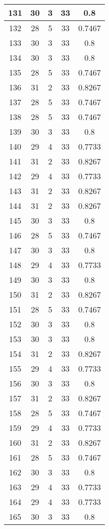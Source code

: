 \documentclass[letterpaper, 12pt]{article}
\begin{document}
\begin{longtable}{|c|c|c|c|c|}
\hline
131 & 30 & 3 & 33 & 0.8 \\
\hline
132 & 28 & 5 & 33 & 0.7467 \\
\hline
133 & 30 & 3 & 33 & 0.8 \\
\hline
134 & 30 & 3 & 33 & 0.8 \\
\hline
135 & 28 & 5 & 33 & 0.7467 \\
\hline
136 & 31 & 2 & 33 & 0.8267 \\
\hline
137 & 28 & 5 & 33 & 0.7467 \\
\hline
138 & 28 & 5 & 33 & 0.7467 \\
\hline
139 & 30 & 3 & 33 & 0.8 \\
\hline
140 & 29 & 4 & 33 & 0.7733 \\
\hline
141 & 31 & 2 & 33 & 0.8267 \\
\hline
142 & 29 & 4 & 33 & 0.7733 \\
\hline
143 & 31 & 2 & 33 & 0.8267 \\
\hline
144 & 31 & 2 & 33 & 0.8267 \\
\hline
145 & 30 & 3 & 33 & 0.8 \\
\hline
146 & 28 & 5 & 33 & 0.7467 \\
\hline
147 & 30 & 3 & 33 & 0.8 \\
\hline
148 & 29 & 4 & 33 & 0.7733 \\
\hline
149 & 30 & 3 & 33 & 0.8 \\
\hline
150 & 31 & 2 & 33 & 0.8267 \\
\hline
151 & 28 & 5 & 33 & 0.7467 \\
\hline
152 & 30 & 3 & 33 & 0.8 \\
\hline
153 & 30 & 3 & 33 & 0.8 \\
\hline
154 & 31 & 2 & 33 & 0.8267 \\
\hline
155 & 29 & 4 & 33 & 0.7733 \\
\hline
156 & 30 & 3 & 33 & 0.8 \\
\hline
157 & 31 & 2 & 33 & 0.8267 \\
\hline
158 & 28 & 5 & 33 & 0.7467 \\
\hline
159 & 29 & 4 & 33 & 0.7733 \\
\hline
160 & 31 & 2 & 33 & 0.8267 \\
\hline
161 & 28 & 5 & 33 & 0.7467 \\
\hline
162 & 30 & 3 & 33 & 0.8 \\
\hline
163 & 29 & 4 & 33 & 0.7733 \\
\hline
164 & 29 & 4 & 33 & 0.7733 \\
\hline
165 & 30 & 3 & 33 & 0.8 \\

\end{longtable}
\end{document}
